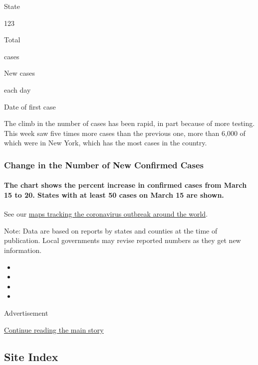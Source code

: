 State

123

Total

cases

New cases

each day

Date of first case

The climb in the number of cases has been rapid, in part because of more
testing. This week saw five times more cases than the previous one, more
than 6,000 of which were in New York, which has the most cases in the
country.

\hypertarget{change-in-the-number-of-new-confirmed-cases}{%
\subsubsection{Change in the Number of New Confirmed
Cases}\label{change-in-the-number-of-new-confirmed-cases}}

\hypertarget{the-chart-shows-the-percent-increase-in-confirmed-cases-from-march-15-to-20-states-with-at-least-50-cases-on-march-15-are-shown}{%
\paragraph{The chart shows the percent increase in confirmed cases from
March 15 to 20. States with at least 50 cases on March 15 are
shown.}\label{the-chart-shows-the-percent-increase-in-confirmed-cases-from-march-15-to-20-states-with-at-least-50-cases-on-march-15-are-shown}}

See our
\href{https://www.nytimes3xbfgragh.onion/interactive/2020/world/coronavirus-maps.html}{maps
tracking the coronavirus outbreak around the world}.

Note: Data are based on reports by states and counties at the time of
publication. Local governments may revise reported numbers as they get
new information.

\begin{itemize}
\item
\item
\item
\item
\end{itemize}

Advertisement

\protect\hyperlink{after-bottom}{Continue reading the main story}

\hypertarget{site-index}{%
\subsection{Site Index}\label{site-index}}

